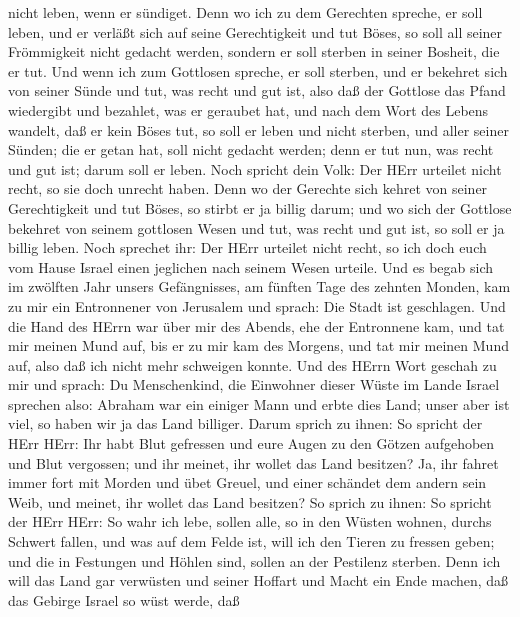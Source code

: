 nicht leben, wenn er sündiget.  Denn wo ich zu dem
Gerechten spreche, er soll leben, und er verläßt sich auf seine
Gerechtigkeit und tut Böses, so soll all seiner Frömmigkeit nicht
gedacht werden, sondern er soll sterben in seiner Bosheit, die er tut.
 Und wenn ich zum Gottlosen spreche, er soll sterben, und
er bekehret sich von seiner Sünde und tut, was recht und gut ist,
 also daß der Gottlose das Pfand wiedergibt und bezahlet,
was er geraubet hat, und nach dem Wort des Lebens wandelt, daß er kein
Böses tut, so soll er leben und nicht sterben,  und aller
seiner Sünden; die er getan hat, soll nicht gedacht werden; denn er tut
nun, was recht und gut ist; darum soll er leben.  Noch
spricht dein Volk: Der HErr urteilet nicht recht, so sie doch unrecht
haben.  Denn wo der Gerechte sich kehret von seiner
Gerechtigkeit und tut Böses, so stirbt er ja billig darum; 
und wo sich der Gottlose bekehret von seinem gottlosen Wesen und tut,
was recht und gut ist, so soll er ja billig leben.  Noch
sprechet ihr: Der HErr urteilet nicht recht, so ich doch euch vom Hause
Israel einen jeglichen nach seinem Wesen urteile.  Und es
begab sich im zwölften Jahr unsers Gefängnisses, am fünften Tage des
zehnten Monden, kam zu mir ein Entronnener von Jerusalem und sprach: Die
Stadt ist geschlagen.  Und die Hand des HErrn war über mir
des Abends, ehe der Entronnene kam, und tat mir meinen Mund auf, bis er
zu mir kam des Morgens, und tat mir meinen Mund auf, also daß ich nicht
mehr schweigen konnte.  Und des HErrn Wort geschah zu mir
und sprach:  Du Menschenkind, die Einwohner dieser Wüste im
Lande Israel sprechen also: Abraham war ein einiger Mann und erbte dies
Land; unser aber ist viel, so haben wir ja das Land billiger.
 Darum sprich zu ihnen: So spricht der HErr HErr: Ihr habt
Blut gefressen und eure Augen zu den Götzen aufgehoben und Blut
vergossen; und ihr meinet, ihr wollet das Land besitzen? 
Ja, ihr fahret immer fort mit Morden und übet Greuel, und einer schändet
dem andern sein Weib, und meinet, ihr wollet das Land besitzen?
 So sprich zu ihnen: So spricht der HErr HErr: So wahr ich
lebe, sollen alle, so in den Wüsten wohnen, durchs Schwert fallen, und
was auf dem Felde ist, will ich den Tieren zu fressen geben; und die in
Festungen und Höhlen sind, sollen an der Pestilenz sterben.
 Denn ich will das Land gar verwüsten und seiner Hoffart
und Macht ein Ende machen, daß das Gebirge Israel so wüst werde, daß
